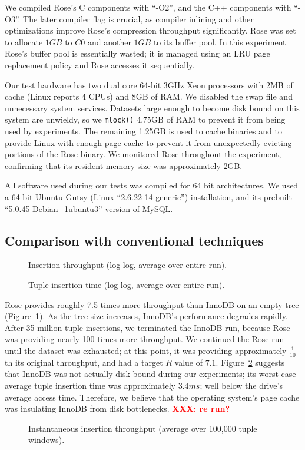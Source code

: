 \documentclass{vldb}
\newcommand{\rows}{Rose\xspace}
\newcommand{\rowss}{Rose's\xspace}
\newcommand{\xxx}[1]{\textcolor{red}{\bf XXX: #1}}
\begin{document}
We compiled \rowss C components with ``-O2'', and the C++ components
with ``-O3''.  The later compiler flag is crucial, as compiler
inlining and other optimizations improve \rowss compression throughput
significantly.  \rows was set to allocate $1GB$ to $C0$ and another
$1GB$ to its buffer pool.  In this experiment \rowss buffer pool is
essentially wasted; it is managed using an LRU page replacement policy
and \rows accesses it sequentially.


Our test hardware has two dual core 64-bit 3GHz Xeon processors with
2MB of cache (Linux reports 4 CPUs) and 8GB of RAM.  We disabled the
swap file and unnecessary system services.  Datasets large enough to
become disk bound on this system are unwieldy, so we {\tt mlock()} 4.75GB of
RAM to prevent it from being used by experiments.
The remaining 1.25GB is used to cache
binaries and to provide Linux with enough page cache to prevent it
from unexpectedly evicting portions of the \rows binary.  We monitored
\rows throughout the experiment, confirming that its resident memory
size was approximately 2GB.

All software used during our tests
was compiled for 64 bit architectures.  We used a 64-bit Ubuntu Gutsy
(Linux ``2.6.22-14-generic'') installation, and its prebuilt
``5.0.45-Debian\_1ubuntu3'' version of MySQL.

\subsection{Comparison with conventional techniques}

\begin{figure}
\centering {}
\caption{Insertion throughput (log-log, average over entire run).}
\label{fig:avg-thru}
\end{figure}
\begin{figure}
\centering
{}
\caption{Tuple insertion time (log-log, average over entire run).}
\label{fig:avg-tup}
\end{figure}

\rows provides
roughly 7.5 times more throughput than InnoDB on an empty tree (Figure~\ref{fig:avg-thru}).  As the tree size
increases, InnoDB's performance degrades rapidly.  After 35 million
tuple insertions, we terminated the InnoDB run, because \rows was providing
nearly 100 times more throughput.  We continued the \rows run until
the dataset was exhausted; at this point, it was providing
approximately $\frac{1}{10}$th its original throughput, and had a
target $R$ value of $7.1$.  Figure~\ref{fig:avg-tup} suggests that
InnoDB was not actually disk bound during our experiments; its
worst-case average tuple insertion time was approximately $3.4 ms$;
well below the drive's average access time.  Therefore, we believe
that the operating system's page cache was insulating InnoDB from disk
bottlenecks. \xxx{re run?}
\begin{figure}
\centering
{}
\caption{Instantaneous insertion throughput (average over 100,000 tuple windows).}
\label{fig:inst-thru}
\end{figure}
\end{document}
